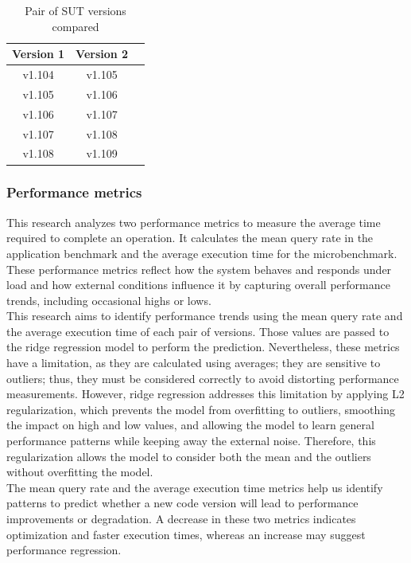 \begin{table}[ht]
    \centering
    \begin{tabular}{c c c} %
        \toprule
        \textbf{Version 1} & \textbf{Version 2} \\
        \midrule
        v1.104 & v1.105 \\
        v1.105 & v1.106 \\
        v1.106 & v1.107 \\
        v1.107 & v1.108 \\
        v1.108 & v1.109 \\
        \bottomrule
    \end{tabular}
    \caption{Pair of SUT versions compared}
    \label{tab:compared_versions}
\end{table}

\subsubsection{Performance metrics}
This research analyzes two performance metrics to measure the average time required to complete an operation. It calculates the mean query rate in the application benchmark and the average execution time for the microbenchmark. These performance metrics reflect how the system behaves and responds under load and how external conditions influence it by capturing overall performance trends, including occasional highs or lows. \\
This research aims to identify performance trends using the mean query rate and the average execution time of each pair of versions. Those values are passed to the ridge regression model to perform the prediction. Nevertheless, these metrics have a limitation, as they are calculated using averages; they are sensitive to outliers; thus, they must be considered correctly to avoid distorting performance measurements. However, ridge regression addresses this limitation by applying L2 regularization, which prevents the model from overfitting to outliers, smoothing the impact on high and low values, and allowing the model to learn general performance patterns while keeping away the external noise. Therefore, this regularization allows the model to consider both the mean and the outliers without overfitting the model. \\
The mean query rate and the average execution time metrics help us identify patterns to predict whether a new code version will lead to performance improvements or degradation. A decrease in these two metrics indicates optimization and faster execution times, whereas an increase may suggest performance regression.  

